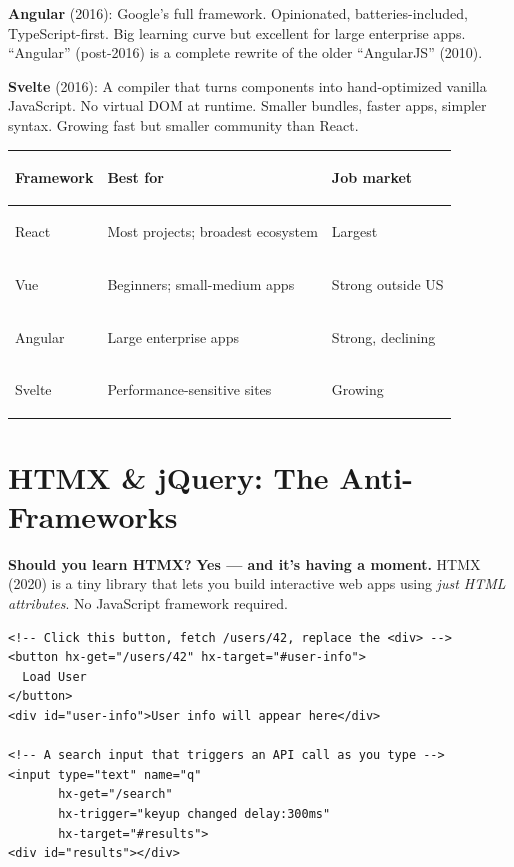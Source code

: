 \documentclass[11pt, letterpaper]{article}
\begin{document}
\textbf{Angular} (2016): Google's full framework. Opinionated, batteries-included, TypeScript-first. Big learning curve but excellent for large enterprise apps. ``Angular'' (post-2016) is a complete rewrite of the older ``AngularJS'' (2010).

\textbf{Svelte} (2016): A compiler that turns components into hand-optimized vanilla JavaScript. No virtual DOM at runtime. Smaller bundles, faster apps, simpler syntax. Growing fast but smaller community than React.

\noindent
{\renewcommand{\arraystretch}{1.5}
\begin{tabularx}{\textwidth}{>{\bfseries\raggedright\arraybackslash}p{2cm}
                              >{\raggedright\arraybackslash}X
                              >{\centering\arraybackslash}p{3cm}}
\toprule
\rowcolor{tableheaderorange}
\textbf{Framework} & \textbf{Best for} & \textbf{Job market} \\
\midrule
\rowcolor{rowOr} React   & Most projects; broadest ecosystem    & Largest \\
\rowcolor{rowA}  Vue     & Beginners; small-medium apps         & Strong outside US \\
\rowcolor{rowOr} Angular & Large enterprise apps                 & Strong, declining \\
\rowcolor{rowA}  Svelte  & Performance-sensitive sites           & Growing \\
\bottomrule
\end{tabularx}}

\section*{HTMX \& jQuery: The Anti-Frameworks}

\textbf{Should you learn HTMX?} \textbf{Yes --- and it's having a moment.} HTMX (2020) is a tiny library that lets you build interactive web apps using \emph{just HTML attributes}. No JavaScript framework required.

\begin{lstlisting}[style=code, caption={HTMX: server-rendered interactivity}]
<!-- Click this button, fetch /users/42, replace the <div> -->
<button hx-get="/users/42" hx-target="#user-info">
  Load User
</button>
<div id="user-info">User info will appear here</div>

<!-- A search input that triggers an API call as you type -->
<input type="text" name="q"
       hx-get="/search"
       hx-trigger="keyup changed delay:300ms"
       hx-target="#results">
<div id="results"></div>
\end{lstlisting}
\end{document}
